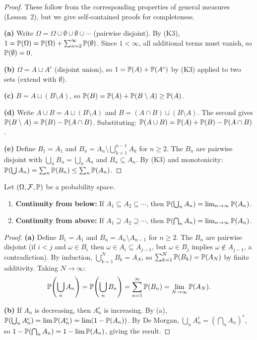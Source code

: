\documentclass[11pt,a4paper]{article}
\begin{document}
\begin{proof}
These follow from the corresponding properties of general measures
(Lesson~2), but we give self-contained proofs for completeness.

\textbf{(a)} Write $\Omega = \Omega \cup \emptyset \cup \emptyset \cup
\cdots$ (pairwise disjoint). By (K3),
$1 = \mathbb{P}(\Omega) = \mathbb{P}(\Omega) + \sum_{n=2}^\infty \mathbb{P}(\emptyset)$.
Since $1 < \infty$, all additional terms must vanish, so
$\mathbb{P}(\emptyset) = 0$.

\textbf{(b)} $\Omega = A \sqcup A^c$ (disjoint union), so
$1 = \mathbb{P}(A) + \mathbb{P}(A^c)$ by (K3) applied to two sets (extend with
$\emptyset$).

\textbf{(c)} $B = A \sqcup (B \setminus A)$, so
$\mathbb{P}(B) = \mathbb{P}(A) + \mathbb{P}(B \setminus A) \geq \mathbb{P}(A)$.

\textbf{(d)} Write $A \cup B = A \sqcup (B \setminus A)$ and
$B = (A \cap B) \sqcup (B \setminus A)$. The second gives
$\mathbb{P}(B \setminus A) = \mathbb{P}(B) - \mathbb{P}(A \cap B)$. Substituting:
$\mathbb{P}(A \cup B) = \mathbb{P}(A) + \mathbb{P}(B) - \mathbb{P}(A \cap B)$.

\textbf{(e)} Define $B_1 = A_1$ and
$B_n = A_n \setminus \bigcup_{k=1}^{n-1} A_k$ for $n \geq 2$. The $B_n$
are pairwise disjoint with $\bigcup_n B_n = \bigcup_n A_n$ and
$B_n \subseteq A_n$. By (K3) and monotonicity:
$\mathbb{P}(\bigcup A_n) = \sum_n \mathbb{P}(B_n) \leq \sum_n \mathbb{P}(A_n)$.
\end{proof}

\begin{theorem}
\label{thm:continuity}
Let $(\Omega, \mathcal{F}, \mathbb{P})$ be a probability space.
\begin{enumerate}[nosep,label=(\alph*)]
  \item \textbf{Continuity from below:} If
    $A_1 \subseteq A_2 \subseteq \cdots$, then
    $\mathbb{P}\!\left(\bigcup_{n} A_n\right)
    = \lim_{n \to \infty} \mathbb{P}(A_n)$.
  \item \textbf{Continuity from above:} If
    $A_1 \supseteq A_2 \supseteq \cdots$, then
    $\mathbb{P}\!\left(\bigcap_{n} A_n\right)
    = \lim_{n \to \infty} \mathbb{P}(A_n)$.
\end{enumerate}
\end{theorem}

\begin{proof}
\textbf{(a)} Define $B_1 = A_1$ and $B_n = A_n \setminus A_{n-1}$ for
$n \geq 2$. The $B_n$ are pairwise disjoint (if $i < j$ and
$\omega \in B_i$ then $\omega \in A_i \subseteq A_{j-1}$, but
$\omega \in B_j$ implies $\omega \notin A_{j-1}$, a contradiction).
By induction, $\bigcup_{k=1}^N B_k = A_N$, so
$\sum_{k=1}^N \mathbb{P}(B_k) = \mathbb{P}(A_N)$ by finite additivity. Taking
$N \to \infty$:
\[
  \mathbb{P}\!\left(\bigcup_n A_n\right)
  = \mathbb{P}\!\left(\bigcup_n B_n\right)
  = \sum_{n=1}^\infty \mathbb{P}(B_n)
  = \lim_{N \to \infty} \mathbb{P}(A_N).
\]

\textbf{(b)} If $A_n$ is decreasing, then $A_n^c$ is increasing. By (a),
$\mathbb{P}(\bigcup_n A_n^c) = \lim \mathbb{P}(A_n^c) = \lim (1 - \mathbb{P}(A_n))$.
By De Morgan, $\bigcup_n A_n^c = (\bigcap_n A_n)^c$, so
$1 - \mathbb{P}(\bigcap_n A_n) = 1 - \lim \mathbb{P}(A_n)$, giving the result.
\end{proof}
\end{document}

